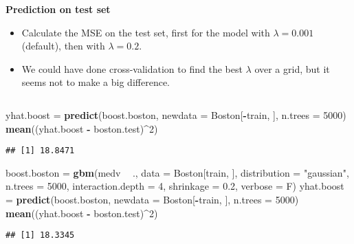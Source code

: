 \documentclass[10pt,ignorenonframetext,]{beamer}
\newenvironment{Shaded}{\begin{snugshade}}{\end{snugshade}}
\newcommand{\DataTypeTok}[1]{\textcolor[rgb]{0.13,0.29,0.53}{#1}}
\newcommand{\DecValTok}[1]{\textcolor[rgb]{0.00,0.00,0.81}{#1}}
\newcommand{\FloatTok}[1]{\textcolor[rgb]{0.00,0.00,0.81}{#1}}
\newcommand{\KeywordTok}[1]{\textcolor[rgb]{0.13,0.29,0.53}{\textbf{#1}}}
\newcommand{\NormalTok}[1]{#1}
\newcommand{\OperatorTok}[1]{\textcolor[rgb]{0.81,0.36,0.00}{\textbf{#1}}}
\newcommand{\StringTok}[1]{\textcolor[rgb]{0.31,0.60,0.02}{#1}}
\begin{document}
\begin{frame}[fragile]

\textbf{Prediction on test set}

\begin{itemize}
\item
  Calculate the MSE on the test set, first for the model with
  \(\lambda=0.001\) (default), then with \(\lambda=0.2\).
\item
  We could have done cross-validation to find the best \(\lambda\) over
  a grid, but it seems not to make a big difference.
\end{itemize}

\(~\)

\scriptsize

\begin{Shaded}
\begin{Highlighting}[]
\NormalTok{yhat.boost =}\StringTok{ }\KeywordTok{predict}\NormalTok{(boost.boston, }\DataTypeTok{newdata =}\NormalTok{ Boston[}\OperatorTok{-}\NormalTok{train, ], }\DataTypeTok{n.trees =} \DecValTok{5000}\NormalTok{)}
\KeywordTok{mean}\NormalTok{((yhat.boost }\OperatorTok{-}\StringTok{ }\NormalTok{boston.test)}\OperatorTok{^}\DecValTok{2}\NormalTok{)}
\end{Highlighting}
\end{Shaded}

\begin{verbatim}
## [1] 18.8471
\end{verbatim}

\vspace{2mm}

\begin{Shaded}
\begin{Highlighting}[]
\NormalTok{boost.boston =}\StringTok{ }\KeywordTok{gbm}\NormalTok{(medv }\OperatorTok{~}\StringTok{ }\NormalTok{., }\DataTypeTok{data =}\NormalTok{ Boston[train, ], }\DataTypeTok{distribution =} \StringTok{"gaussian"}\NormalTok{, }
    \DataTypeTok{n.trees =} \DecValTok{5000}\NormalTok{, }\DataTypeTok{interaction.depth =} \DecValTok{4}\NormalTok{, }\DataTypeTok{shrinkage =} \FloatTok{0.2}\NormalTok{, }\DataTypeTok{verbose =}\NormalTok{ F)}
\NormalTok{yhat.boost =}\StringTok{ }\KeywordTok{predict}\NormalTok{(boost.boston, }\DataTypeTok{newdata =}\NormalTok{ Boston[}\OperatorTok{-}\NormalTok{train, ], }\DataTypeTok{n.trees =} \DecValTok{5000}\NormalTok{)}
\KeywordTok{mean}\NormalTok{((yhat.boost }\OperatorTok{-}\StringTok{ }\NormalTok{boston.test)}\OperatorTok{^}\DecValTok{2}\NormalTok{)}
\end{Highlighting}
\end{Shaded}

\begin{verbatim}
## [1] 18.3345
\end{verbatim}

\end{frame}
\end{document}
